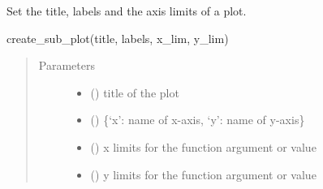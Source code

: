 \documentclass[letterpaper,10pt,english,openany,oneside]{sphinxmanual}
\begin{document}
\begin{fulllineitems}
\begin{fulllineitems}
\end{fulllineitems}


\begin{fulllineitems}
\label{\detokenize{pygpc:pygpc.vis.Visualization.create_sub_plot}}
Set the title, labels and the axis limits of a plot.

create\_sub\_plot(title, labels, x\_lim, y\_lim)
\begin{quote}\begin{description}
\item[{Parameters}] \leavevmode\begin{itemize}
\item {} 
 () \textendash{} title of the plot

\item {} 
 () \textendash{} \{‘x’: name of x-axis, ‘y’: name of y-axis\}

\item {} 
 (\sphinxstyleliteralemphasis{\sphinxupquote{{[}}}\sphinxstyleliteralemphasis{\sphinxupquote{{]} }}) \textendash{} x limits for the function argument or value

\item {} 
 (\sphinxstyleliteralemphasis{\sphinxupquote{{[}}}\sphinxstyleliteralemphasis{\sphinxupquote{{]} }}) \textendash{} y limits for the function argument or value

\end{itemize}

\end{description}\end{quote}

\end{fulllineitems}



\end{fulllineitems}
\end{document}
